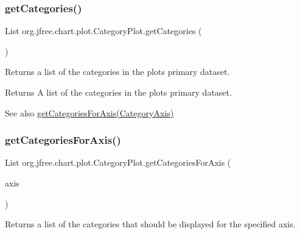 \subsubsection{\texorpdfstring{get\+Categories()}{getCategories()}}
{\footnotesize\ttfamily List org.\+jfree.\+chart.\+plot.\+Category\+Plot.\+get\+Categories (\begin{DoxyParamCaption}{ }\end{DoxyParamCaption})}

Returns a list of the categories in the plot\textquotesingle{}s primary dataset.

\begin{DoxyReturn}{Returns}
A list of the categories in the plot\textquotesingle{}s primary dataset.
\end{DoxyReturn}
\begin{DoxySeeAlso}{See also}
\mbox{\hyperlink{classorg_1_1jfree_1_1chart_1_1plot_1_1_category_plot_a879a45cd478b62daf45aa2d82a49546e}{get\+Categories\+For\+Axis(\+Category\+Axis)}} 
\end{DoxySeeAlso}
\mbox{\label{classorg_1_1jfree_1_1chart_1_1plot_1_1_category_plot_a879a45cd478b62daf45aa2d82a49546e}} 
\subsubsection{\texorpdfstring{get\+Categories\+For\+Axis()}{getCategoriesForAxis()}}
{\footnotesize\ttfamily List org.\+jfree.\+chart.\+plot.\+Category\+Plot.\+get\+Categories\+For\+Axis (\begin{DoxyParamCaption}\item[{\mbox{\hyperlink{classorg_1_1jfree_1_1chart_1_1axis_1_1_category_axis}{Category\+Axis}}}]{axis }\end{DoxyParamCaption})}

Returns a list of the categories that should be displayed for the specified axis.


